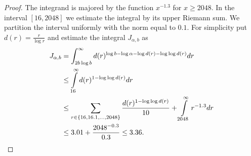 \begin{proof}
The integrand is majored by the function $x ^ {-1.3}$ for $x \geq 2048$. In the interval $[16, 2048]$ we estimate the integral by its upper Riemann sum. We partition the interval uniformly with the norm equal to $0.1$. For simplicity put $d(r) = \frac{r}{\log r}$ and estimate the integral $J_{\alpha, b}$ as
\[
\begin{split}
J_{\alpha, b} 
	& = \int_{2 b \log b}^{\infty} d(r) ^ {\log b - \log \alpha - \log d(r) - \log \log d(r)} dr \\
	& \leq \int\limits_{16}^{\infty} d(r) ^ {1 - \log \log d(r)} dr \\
	& \leq \sum\displaylimits_{r \in \{16, 16.1, \dots, 2048 \}} \frac{d(r) ^ {1 - \log \log d(r)}}{10} + 
		\int\limits_{2048}^{\infty} r ^ {-1.3} dr \\
	& \leq 3.01 + \frac{2048 ^ {-0.3}}{0.3} \leq 3.36 \text{.}
\end{split}
\]
\end{proof}